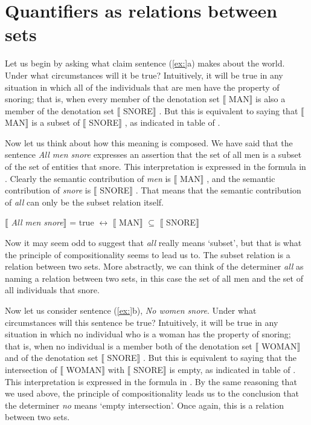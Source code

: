 \section{Quantifiers as relations between sets}\label{sec:14.2}

Let us begin by asking what claim sentence (\ref{ex:}a) makes about the world. Under what circumstances will it be true? Intuitively, it will be true in any situation in which all of the individuals that are men have the property of snoring; that is, when every member of the denotation set $\llbracket$ MAN$\rrbracket$  is also a member of the denotation set $\llbracket$ SNORE$\rrbracket$ . But this is equivalent to saying that $\llbracket$ MAN$\rrbracket$  is a subset of $\llbracket$ SNORE$\rrbracket$ , as indicated in table  of .



Now let us think about how this meaning is composed. We have said that the sentence \textit{All men snore} expresses an assertion that the set of all men is a subset of the set of entities that snore. This interpretation is expressed in the formula in . Clearly the semantic contribution of \textit{men} is $\llbracket$ MAN$\rrbracket$ , and the semantic contribution of \textit{snore} is $\llbracket$ SNORE$\rrbracket$ . That means that the semantic contribution of \textit{all} can only be the subset relation itself.


\ea
{}$\llbracket$ \textit{All men snore}$\rrbracket$  = true $\leftrightarrow $ $\llbracket$ MAN$\rrbracket$  ${\subseteq}$ $\llbracket$ SNORE$\rrbracket$ 
\z


Now it may seem odd to suggest that \textit{all} really means ‘subset’, but that is what the principle of compositionality seems to lead us to. The subset relation is a relation between two sets. More abstractly, we can think of the determiner \textit{all} as naming a relation between two sets, in this case the set of all men and the set of all individuals that snore.



Now let us consider sentence (\ref{ex:}b), \textit{No women snore}. Under what circumstances will this sentence be true? Intuitively, it will be true in any situation in which no individual who is a woman has the property of snoring; that is, when no individual is a member both of the denotation set $\llbracket$ WOMAN$\rrbracket$  and of the denotation set $\llbracket$ SNORE$\rrbracket$ . But this is equivalent to saying that the intersection of $\llbracket$ WOMAN$\rrbracket$  with $\llbracket$ SNORE$\rrbracket$  is empty, as indicated in table  of . This interpretation is expressed in the formula in . By the same reasoning that we used above, the principle of compositionality leads us to the conclusion that the determiner \textit{no} means ‘empty intersection’. Once again, this is a relation between two sets.


